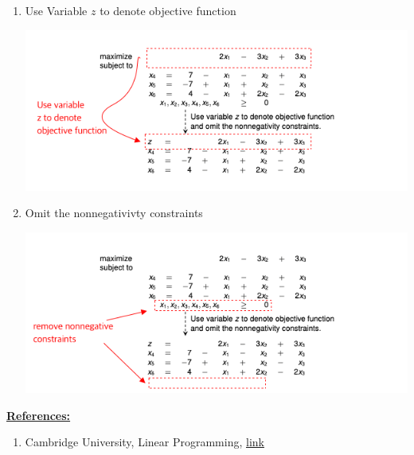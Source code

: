 \documentclass[12pt]{article}
\begin{document}
\begin{enumerate}[1.]
\begin{itemize}
\begin{enumerate}[1)]
            \item Use Variable $z$ to denote objective function

            \begin{center}
            \includegraphics[width=\linewidth]{images/worksheet_6_solution_10.png}
            \end{center}

            \item Omit the nonnegativivty constraints

            \begin{center}
            \includegraphics[width=\linewidth]{images/worksheet_6_solution_11.png}
            \end{center}
        \end{enumerate}
    \end{itemize}

    \bigskip

    \underline{\textbf{References:}}

    \bigskip

    \begin{enumerate}[1)]
        \item Cambridge University, Linear Programming, \href{https://www.cl.cam.ac.uk/teaching/1617/AdvAlgo/lp.pdf}{link}
    \end{enumerate}
\end{enumerate}
\end{document}
